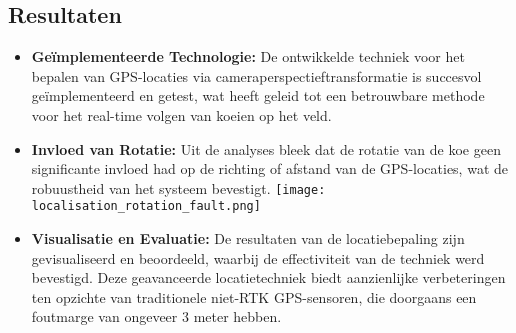 \subsection{Resultaten}
\begin{itemize}
  \item \textbf{Geïmplementeerde Technologie:} De ontwikkelde techniek voor het bepalen van GPS-locaties via cameraperspectieftransformatie is succesvol geïmplementeerd en getest, wat heeft geleid tot een betrouwbare methode voor het real-time volgen van koeien op het veld.
  \item \textbf{Invloed van Rotatie:} Uit de analyses bleek dat de rotatie van de koe geen significante invloed had op de richting of afstand van de GPS-locaties, wat de robuustheid van het systeem bevestigt. 
  \newline 
  \texttt{[image: localisation\_rotation\_fault.png]}
  \newline
  \item \textbf{Visualisatie en Evaluatie:} De resultaten van de locatiebepaling zijn gevisualiseerd en beoordeeld, waarbij de effectiviteit van de techniek werd bevestigd. Deze geavanceerde locatietechniek biedt aanzienlijke verbeteringen ten opzichte van traditionele niet-RTK GPS-sensoren, die doorgaans een foutmarge van ongeveer 3 meter hebben.
\end{itemize}